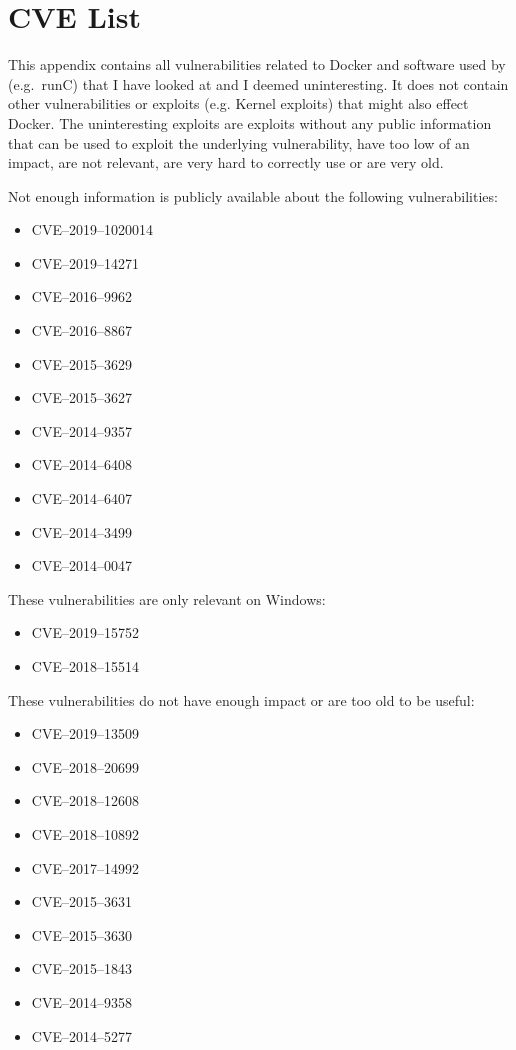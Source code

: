 \chapter{CVE List}\label{appendix:CVE-List}

This appendix contains all vulnerabilities related to Docker and software used by (e.g.\ runC) that I have looked at and I deemed uninteresting. It does not contain other vulnerabilities or exploits (e.g. Kernel exploits) that might also effect Docker. The uninteresting exploits are exploits without any public information that can be used to exploit the underlying vulnerability, have too low of an impact, are not relevant, are very hard to correctly use or are very old.

\medskip

Not enough information is publicly available about the following vulnerabilities:
\begin{multicols}{2}
    \begin{itemize}
        \item CVE--2019--1020014
        \item CVE--2019--14271
        \item CVE--2016--9962
        \item CVE--2016--8867
        \item CVE--2015--3629
        \item CVE--2015--3627
        \item CVE--2014--9357
        \item CVE--2014--6408
        \item CVE--2014--6407
        \item CVE--2014--3499
        \item CVE--2014--0047
    \end{itemize}
\end{multicols}

\medskip

These vulnerabilities are only relevant on Windows:
\begin{itemize}
    \item CVE--2019--15752
    \item CVE--2018--15514
\end{itemize}

\medskip

These vulnerabilities do not have enough impact or are too old to be useful:
\begin{itemize}
    \item CVE--2019--13509
    \item CVE--2018--20699
    \item CVE--2018--12608
    \item CVE--2018--10892
    \item CVE--2017--14992
    \item CVE--2015--3631
    \item CVE--2015--3630
    \item CVE--2015--1843
    \item CVE--2014--9358
    \item CVE--2014--5277
\end{itemize}
